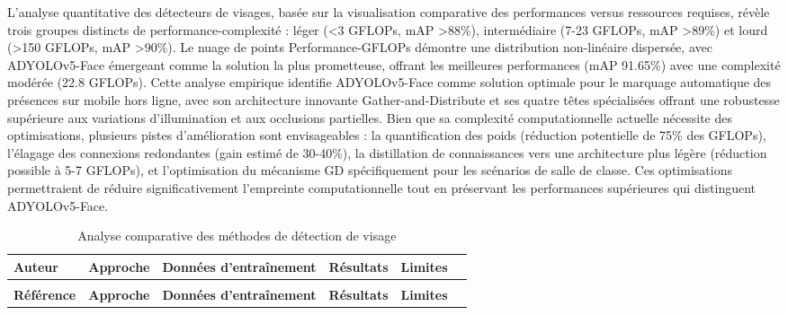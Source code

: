 \begin{onehalfspace}
\hspace{0.65cm}\hspace{0.65cm} L'analyse quantitative des détecteurs de visages, basée sur la visualisation comparative des performances versus ressources requises, révèle trois groupes distincts de performance-complexité : léger (<3 GFLOPs, mAP >88\%), intermédiaire (7-23 GFLOPs, mAP >89\%) et lourd (>150 GFLOPs, mAP >90\%). Le nuage de points Performance-GFLOPs démontre une distribution non-linéaire dispersée, avec ADYOLOv5-Face émergeant comme la solution la plus prometteuse, offrant les meilleures performances (mAP 91.65\%) avec une complexité modérée (22.8 GFLOPs). Cette analyse empirique identifie ADYOLOv5-Face comme solution optimale pour le marquage automatique des présences sur mobile hors ligne, avec son architecture innovante Gather-and-Distribute et ses quatre têtes spécialisées offrant une robustesse supérieure aux variations d'illumination et aux occlusions partielles. Bien que sa complexité computationnelle actuelle nécessite des optimisations, plusieurs pistes d'amélioration sont envisageables : la quantification des poids (réduction potentielle de 75\% des GFLOPs), l'élagage des connexions redondantes (gain estimé de 30-40\%), la distillation de connaissances vers une architecture plus légère (réduction possible à 5-7 GFLOPs), et l'optimisation du mécanisme GD spécifiquement pour les scénarios de salle de classe. Ces optimisations permettraient de réduire significativement l'empreinte computationnelle tout en préservant les performances supérieures qui distinguent ADYOLOv5-Face.



\begin{xltabular}{\textwidth}{>{\RaggedRight\arraybackslash}p{2cm} >{\RaggedRight\arraybackslash}p{3cm} >{\RaggedRight\arraybackslash}p{3.5cm} >{\RaggedRight\arraybackslash}p{2.5cm} >{\RaggedRight\arraybackslash}p{2.5cm} >{\RaggedRight\arraybackslash}p{2.5cm}}
\caption{Analyse comparative des méthodes de détection de visage}
\label{tab:face-detection-detailed} \\

\toprule
\textbf{Auteur}  & \textbf{Approche} & \textbf{Données d'entraînement} & \textbf{Résultats} & \textbf{Limites} \\
\midrule
\endfirsthead

 \\
\toprule
\textbf{Référence} & \textbf{Approche} & \textbf{Données d'entraînement} & \textbf{Résultats} & \textbf{Limites} \\
\midrule
\endhead


\end{xltabular}
\end{onehalfspace}
